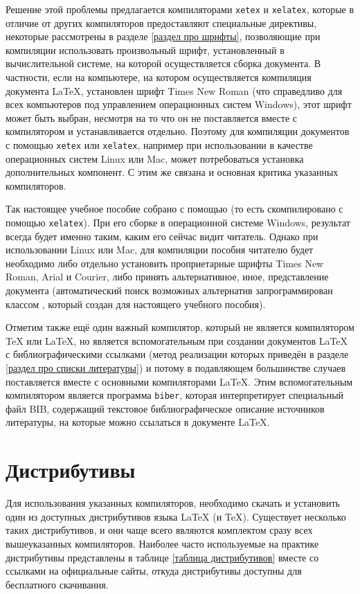 \documentclass[workbook]{fefudoc}
\begin{document}
Решение этой проблемы предлагается компиляторами \texttt{xetex} и \texttt{xelatex}, которые в отличие от других компиляторов предоставляют специальные директивы, некоторые рассмотрены в разделе \ref{раздел про шрифты}, позволяющие при компиляции использовать произвольный шрифт, установленный в вычислительной системе, на которой осуществляется сборка документа.
В частности, если на компьютере, на котором осуществляется компиляция документа \LaTeX{}, установлен шрифт Times New Roman (что справедливо для всех компьютеров под управлением операционных систем Windows), этот шрифт может быть выбран, несмотря на то что он не поставляется вместе с компилятором и устанавливается отдельно.
Поэтому для компиляции документов с помощью \texttt{xetex} или \texttt{xelatex}, например при использовании в качестве операционных систем Linux или Mac, может потребоваться установка дополнительных компонент.
С этим же связана и основная критика указанных компиляторов.

Так настоящее учебное пособие собрано с помощью \XeLaTeX{} (то есть скомпилировано с помощью \texttt{xelatex}).
При его сборке в операционной системе Windows, результат всегда будет именно таким, каким его сейчас видит читатель.
Однако при использовании Linux или Mac, для компиляции пособия читателю будет необходимо либо отдельно установить проприетарные шрифты Times New Roman, Arial и Courier, либо принять альтернативное, иное, представление документа (автоматический поиск возможных альтернатив запрограммирован классом \XeLaTeX{}, который создан для настоящего учебного пособия).

Отметим также ещё один важный компилятор, который не является компилятором \TeX{} или \LaTeX{}, но является вспомогательным при создании документов \LaTeX{} с библиографическими ссылками (метод реализации которых приведён в разделе \ref{раздел про списки литературы}) и потому в подавляющем большинстве случаев поставляется вместе с основными компиляторами \LaTeX{}.
Этим вспомогательным компилятором является программа \texttt{biber}, которая интерпретирует специальный файл BIB, содержащий текстовое библиографическое описание источников литературы, на которые можно ссылаться в документе \LaTeX{}.

\section{Дистрибутивы}\label{раздел про дистрибутивы}
Для использования указанных компиляторов, необходимо скачать и установить один из доступных дистрибутивов языка \LaTeX{} (и \TeX{}).
Существует несколько таких дистрибутивов, и они чаще всего являются комплектом сразу всех вышеуказанных компиляторов.
Наиболее часто используемые на практике дистрибутивы представлены в таблице \ref{таблица дистрибутивов} вместе со ссылками на официальные сайты, откуда дистрибутивы доступны для бесплатного скачивания.
\end{document}

